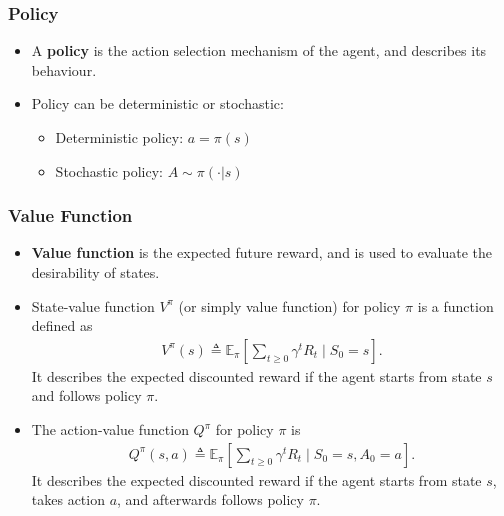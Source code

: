 \documentclass[handout]{beamer}
\newcommand{\eqdef}{\triangleq}
\newcommand{\EEX}[2]{{\mathbb E}_{#1}\left[#2\right]}
\newcommand{\Vpi}{V^\pi}
\newcommand{\Qpi}{Q^\pi}
\renewcommand{\high}{\textbf}
\begin{document}
\begin{frame}\frametitle{Policy}\small
\begin{itemize}
\item A \high{policy} is the action selection mechanism of the agent, and describes its behaviour.
\item Policy can be deterministic or stochastic:
	\begin{itemize}
		\item Deterministic policy: $a = \pi(s)$
		\item Stochastic policy: $A \sim \pi(\cdot|s)$
	\end{itemize}
\end{itemize}

\end{frame}


\begin{frame}\frametitle{Value Function}\small
\begin{itemize}
\item \high{Value function} is the expected future reward, and is used to evaluate the desirability of states.
\item State-value function $\Vpi$ (or simply value function) for policy $\pi$ is a function defined as
\begin{align*}
	\Vpi(s) \eqdef \EEX{\pi}{\sum_{t \geq 0} \gamma^t R_t \mid S_0 = s}.
\end{align*}
It describes the expected discounted reward if the agent starts from state $s$ and follows policy $\pi$.

\item The action-value function $\Qpi$ for policy $\pi$ is
\begin{align*}
	\Qpi(s,a) \eqdef \EEX{\pi}{\sum_{t \geq 0} \gamma^t R_t \mid S_0 = s, A_0 = a}.
\end{align*}
It describes the expected discounted reward if the agent starts from state $s$, takes action $a$, and afterwards follows policy $\pi$.

\end{itemize}

\end{frame}
\end{document}

